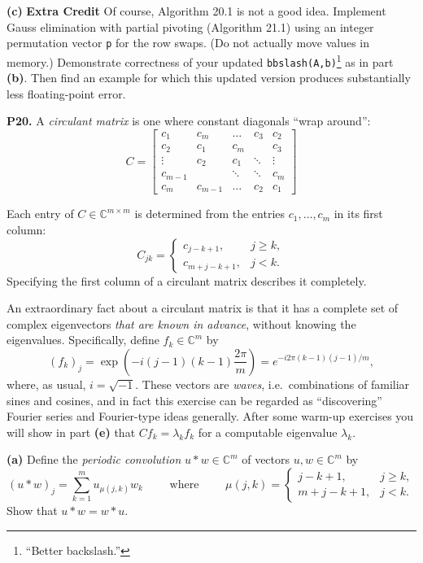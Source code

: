 \documentclass[12pt]{amsart}
\newcommand{\CC}{\mathbb{C}}
\newcommand{\prob}[1]{\bigskip\noindent\textbf{#1.}\quad }
\newcommand{\epart}[1]{\medskip\noindent\textbf{(#1)}\quad }
\begin{document}
\epart{c}  \textbf{Extra Credit} \quad Of course, Algorithm 20.1 is not a good idea.  Implement Gauss elimination with partial pivoting (Algorithm 21.1) using an integer permutation vector \texttt{p} for the row swaps.  (Do not actually move values in memory.)  Demonstrate correctness of your updated \verb|bbslash(A,b)|\footnote{``Better backslash.''} as in part \textbf{(b)}.  Then find an example for which this updated version produces substantially less floating-point error.


\prob{P20}   A \emph{circulant matrix} is one where constant diagonals ``wrap around'':
\begin{equation} \label{circuC}
C = \begin{bmatrix}
	c_1 & c_{m} & \dots & c_3 & c_2 \\
	c_2 & c_1 & c_{m} & & c_3 \\
	\vdots & c_2 & c_1 & \ddots & \vdots \\
	c_{m-1} & & \ddots & \ddots & c_{m} \\
	c_{m} & c_{m-1} & \dots & c_2 & c_1
	\end{bmatrix}
\end{equation}
\smallskip

\noindent Each entry of $C \in \CC^{m\times m}$ is determined from the entries $c_1, \dots, c_{m}$ in its first column:
	$$C_{jk} = \begin{cases}
	c_{j-k + 1}, & j \ge k, \\
	c_{m + j-k + 1}, & j < k.
	\end{cases}$$
Specifying the first column of a circulant matrix describes it completely.

An extraordinary fact about a circulant matrix is that it has a complete set of complex eigenvectors \emph{that are known in advance}, without knowing the eigenvalues.  Specifically, define $f_k \in \CC^m$ by
\begin{equation}
(f_k)_j = \exp\left(-i(j-1) (k-1) \frac{2\pi}{m}\right) = e^{-i 2\pi (k-1)(j-1)/m}, \label{circulantev}
\end{equation}
where, as usual, $i=\sqrt{-1}$.  These vectors are \emph{waves}, i.e.~combinations of familiar sines and cosines, and in fact this exercise can be regarded as ``discovering'' Fourier series and Fourier-type ideas generally.  After some warm-up exercises you will show in part \textbf{(e)} that $C f_k = \lambda_k f_k$ for a computable eigenvalue $\lambda_k$.

\epart{a}  Define the \emph{periodic convolution} $u \ast w\in \CC^m$ of vectors $u,w\in \CC^m$ by
	$$(u\ast w)_j = \sum_{k=1}^m u_{\mu(j,k)} w_k \qquad \text{ where } \qquad \mu(j,k) = \begin{cases}
	j-k + 1, & j \ge k, \\
	m + j-k + 1, & j < k.
	\end{cases}$$
Show that $u\ast w = w\ast u$.
\end{document}
